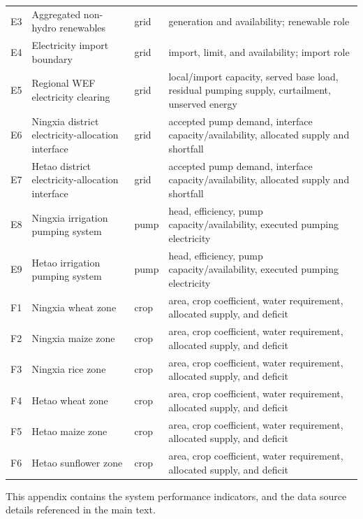 \documentclass [a4paper,fleqn] {cas-dc}
\begin{document}
\begin{table}[pos=t]
\begin{tabularx}{\textwidth}{@{}l >{\raggedright\arraybackslash}p{} l
  >{\raggedright\arraybackslash}X@{}}
E3 & Aggregated non-hydro renewables & grid & generation and availability; renewable role \\
E4 & Electricity import boundary & grid & import, limit, and availability; import role \\
E5 & Regional WEF electricity clearing & grid & local/import capacity, served base load, residual pumping supply, curtailment, unserved energy \\
E6 & Ningxia district electricity-allocation interface & grid & accepted pump demand, interface capacity/availability, allocated supply and shortfall \\
E7 & Hetao district electricity-allocation interface & grid & accepted pump demand, interface capacity/availability, allocated supply and shortfall \\
E8 & Ningxia irrigation pumping system & pump & head, efficiency, pump capacity/availability, executed pumping electricity \\
E9 & Hetao irrigation pumping system & pump & head, efficiency, pump capacity/availability, executed pumping electricity \\
\midrule
F1 & Ningxia wheat zone & crop & area, crop coefficient, water requirement, allocated supply, and deficit \\
F2 & Ningxia maize zone & crop & area, crop coefficient, water requirement, allocated supply, and deficit \\
F3 & Ningxia rice zone & crop & area, crop coefficient, water requirement, allocated supply, and deficit \\
F4 & Hetao wheat zone & crop & area, crop coefficient, water requirement, allocated supply, and deficit \\
F5 & Hetao maize zone & crop & area, crop coefficient, water requirement, allocated supply, and deficit \\
F6 & Hetao sunflower zone & crop & area, crop coefficient, water requirement, allocated supply, and deficit \\
\bottomrule
\end{tabularx}
\end{table}
\FloatBarrier


This appendix contains the system performance indicators, and the data source details referenced in the main text.

\end{document}
